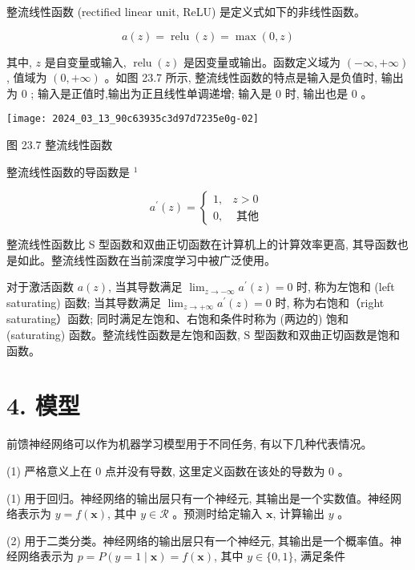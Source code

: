 \documentclass[10pt]{article}
\begin{document}
\begin{CJK*}{UTF8}{bsmi}
整流线性函数 (rectified linear unit, ReLU) 是定义式如下的非线性函数。


\begin{equation*}
a(z)=\operatorname{relu}(z)=\max (0, z) \tag{23.19}
\end{equation*}


其中, $z$ 是自变量或输入, $\operatorname{relu}(z)$ 是因变量或输出。函数定义域为 $(-\infty,+\infty)$, 值域为 $(0,+\infty)$ 。如图 23.7 所示, 整流线性函数的特点是输入是负值时, 输出为 0 ; 输入是正值时,输出为正且线性单调递增; 输入是 0 时, 输出也是 0 。

\begin{center}
\texttt{[image: 2024\_03\_13\_90c63935c3d97d7235e0g-02]}
\end{center}

图 23.7 整流线性函数

整流线性函数的导函数是 ${ }^{1}$

\[
a^{\prime}(z)= \begin{cases}1, & z>0  \tag{23.20}\\ 0, & \text { 其他 }\end{cases}
\]

整流线性函数比 S 型函数和双曲正切函数在计算机上的计算效率更高, 其导函数也是如此。整流线性函数在当前深度学习中被广泛使用。

对于激活函数 $a(z)$, 当其导数满足 $\lim _{z \rightarrow-\infty} a^{\prime}(z)=0$ 时, 称为左饱和 (left saturating) 函数; 当其导数满足 $\lim _{z \rightarrow+\infty} a^{\prime}(z)=0$ 时, 称为右饱和（right saturating）函数; 同时满足左饱和、右饱和条件时称为 (两边的) 饱和 (saturating) 函数。整流线性函数是左饱和函数, $\mathrm{S}$ 型函数和双曲正切函数是饱和函数。

\section*{4. 模型}
前馈神经网络可以作为机器学习模型用于不同任务, 有以下几种代表情况。

(1) 严格意义上在 0 点并没有导数, 这里定义函数在该处的导数为 0 。

(1) 用于回归。神经网络的输出层只有一个神经元, 其输出是一个实数值。神经网络表示为 $y=f(\boldsymbol{x})$, 其中 $y \in \mathcal{R}$ 。预测时给定输入 $\boldsymbol{x}$, 计算输出 $y$ 。

(2) 用于二类分类。神经网络的输出层只有一个神经元, 其输出是一个概率值。神经网络表示为 $p=P(y=1 \mid \boldsymbol{x})=f(\boldsymbol{x})$, 其中 $y \in\{0,1\}$, 满足条件


\end{CJK*}
\end{document}

